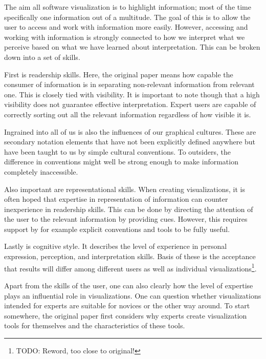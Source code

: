\documentclass[11pt, a4paper, ngerman, twoside]{article}
\theoremstyle{plain}\newtheorem{Lemma}{Lemma}
\theoremstyle{plain}\newtheorem{Satz}[Lemma]{Satz}
\theoremstyle{definition}\newtheorem{Definition}[Lemma]{Definition}
\theoremstyle{definition}\newtheorem*{Beispiel}{Beispiel}
\theoremstyle{remark}\newtheorem*{Bemerkung}{Bemerkung}
\begin{document}
The aim all software visualization is to highlight information; most of the time specifically one information out of a multitude. The goal of this is to allow the user to access and work with information more easily. However, accessing and working with information is strongly connected to how we interpret what we perceive based on what we have learned about interpretation. This can be broken down into a set of skills.

First is readership skills. Here, the original paper means how capable the consumer of information is in separating non-relevant information from relevant one. This is closely tied with visibility. It is important to note though that a high visibility does not guarantee effective interpretation. Expert users are capable of correctly sorting out all the relevant information regardless of how visible it is.

Ingrained into all of us is also the influences of our graphical cultures. These are secondary notation elements that have not been explicitly defined anywhere but have been taught to us by simple cultural conventions. To outsiders, the difference in conventions might well be strong enough to make information completely inaccessible.

Also important are representational skills. When creating visualizations, it is often hoped that expertise in representation of information can counter inexperience in readership skills. This can be done by directing the attention of the user to the relevant information by providing cues. However, this requires support by for example explicit conventions and tools to be fully useful.

Lastly is cognitive style. It describes the level of experience in personal expression, perception, and interpretation skills. Basis of these is the acceptance that results will differ among different users as well as individual visualizations\footnote{TODO: Reword, too close to original!}.

Apart from the skills of the user, one can also clearly how the level of expertise plays an influential role in visualizations. One can question whether visualizations intended for experts are suitable for novices or the other way around. To start somewhere, the original paper first considers why experts create visualization tools for themselves and the characteristics of these tools.
\end{document}
